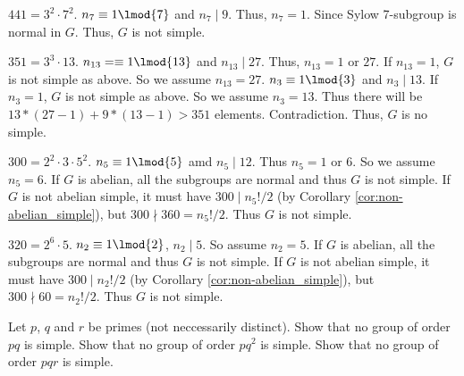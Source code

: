 \begin{solution}[\bf Solution.]
$441 = 3^2 \cdot 7^2$. $n_7 \equiv 1 \lmod{7}$ and $n_7 \mid 9$. Thus, $n_7 = 1$. Since Sylow 7-subgroup is normal in $G$. Thus, $G$ is not simple.

$351 = 3^3 \cdot 13$. $n_{13} = \equiv 1 \lmod{13}$ and $n_{13} \mid 27$. Thus, $n_{13} = 1$ or $27$. If $n_{13} =1$, $G$ is not simple as above. So we assume $n_{13} = 27$. $n_3 \equiv 1 \lmod{3}$ and $n_3 \mid 13$. If $n_3 =1$, $G$ is not simple as above. So we assume $n_3 = 13$. Thus there will be $13 *(27-1) + 9 *(13 -1) > 351$ elements. Contradiction. Thus, $G$ is no simple.

$300 = 2^2 \cdot 3 \cdot 5^2$. $n_5 \equiv 1 \lmod{5}$ amd $n_5 \mid 12$. Thus $n_5 = 1$ or 6. So we assume $n_5 = 6$. If $G$ is abelian, all the subgroups are normal and thus $G$ is not simple. If $G$ is not abelian simple, it must have $300\mid n_5!/2$ (by Corollary \ref{cor:non-abelian_simple}), but $300 \nmid 360 = n_5!/2$. Thus
$G$ is not simple.

$320 = 2^6 \cdot 5$. $n_2\equiv 1 \lmod{2}$, $n_2 \mid 5$. So assume $n_2 = 5$. If $G$ is abelian, all the subgroups are normal and thus $G$ is not simple. If $G$ is not abelian simple, it must have $300\mid n_2!/2$ (by Corollary \ref{cor:non-abelian_simple}), but $300 \nmid 60 = n_2!/2$. Thus $G$ is not simple. %
\end{solution}




\begin{problem}\label{ques:simple_prime_product}
Let $p$, $q$ and $r$ be primes (not neccessarily distinct). Show that no group of order $pq$ is simple. Show that no group of order $pq^2$ is simple. Show that no group of order $pqr$ is simple.
\end{problem}

